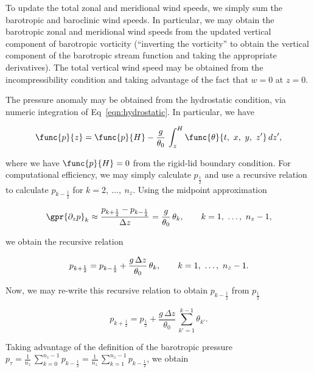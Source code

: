 To update the total zonal and meridional wind speeds, we simply sum the barotropic and baroclinic wind speeds. In particular, we may obtain the barotropic zonal and meridional wind speeds from the updated vertical component of barotropic vorticity (``inverting the vorticity'' to obtain the vertical component of the barotropic stream function and taking the appropriate derivatives). The total vertical wind speed may be obtained from the incompressibility condition and taking advantage of the fact that $w = 0$ at $z = 0$.

The pressure anomaly may be obtained from the hydrostatic condition, via numeric integration of Eq~\ref{eqn:hydrostatic}. In particular, we have

\begin{equation}
	\func{p}{z} = \func{p}{H} - \frac{g}{\theta_0}\,\int_{z}^{H} \func{\theta}{t,\ x,\ y,\ z'}\,dz',
	\label{eqn:press}
\end{equation}

where we have $\func{p}{H} = 0$ from the rigid-lid boundary condition. For computational efficiency, we may simply calculate $p_{\frac{1}{2}}$ and use a recursive relation to calculate $p_{k - \frac{1}{2}}$ for $k = 2,\ \dots,\ n_z$. Using the midpoint approximation

\begin{equation}
	\gpr{\partial_z p}_{k} \approx \frac{p_{k + \frac{1}{2}} - p_{k - \frac{1}{2}}}{\Delta z} = \frac{g}{\theta_0}\,\theta_k,\qquad k = 1,\ \dots,\ n_z - 1,
\end{equation}

we obtain the recursive relation

\begin{equation}
	p_{k + \frac{1}{2}} = p_{k - \frac{1}{2}} + \frac{g\,\Delta z}{\theta_0}\,\theta_k,\qquad k = 1,\ \dots,\ n_z - 1.
	\label{eqn:p_{k+1/2}}
\end{equation}

Now, we may re-write this recursive relation to obtain $p_{k - \frac{1}{2}}$ from $p_{\frac{1}{2}}$ 

\begin{equation}
	p_{k + \frac{1}{2}} = p_{\frac{1}{2}} + \frac{g\,\Delta z}{\theta_0}\, \sum_{k' = 1}^{k - 1} \theta_{k'}. 
\end{equation}

Taking advantage of the definition of the barotropic pressure $p_{\tau} = \frac{1}{n_z}\,\sum_{k = 0}^{n_z - 1} p_{k - \frac{1}{2}} = \frac{1}{n_z}\,\sum_{k = 1}^{n_z - 1} p_{k - \frac{1}{2}}$, we obtain

